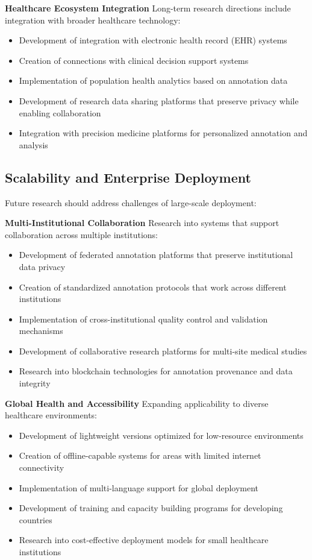 \textbf{Healthcare Ecosystem Integration}
Long-term research directions include integration with broader healthcare technology:

\begin{itemize}
    \item Development of integration with electronic health record (EHR) systems
    \item Creation of connections with clinical decision support systems
    \item Implementation of population health analytics based on annotation data
    \item Development of research data sharing platforms that preserve privacy while enabling collaboration
    \item Integration with precision medicine platforms for personalized annotation and analysis
\end{itemize}

\subsection{Scalability and Enterprise Deployment}

Future research should address challenges of large-scale deployment:

\textbf{Multi-Institutional Collaboration}
Research into systems that support collaboration across multiple institutions:

\begin{itemize}
    \item Development of federated annotation platforms that preserve institutional data privacy
    \item Creation of standardized annotation protocols that work across different institutions
    \item Implementation of cross-institutional quality control and validation mechanisms
    \item Development of collaborative research platforms for multi-site medical studies
    \item Research into blockchain technologies for annotation provenance and data integrity
\end{itemize}

\textbf{Global Health and Accessibility}
Expanding applicability to diverse healthcare environments:

\begin{itemize}
    \item Development of lightweight versions optimized for low-resource environments
    \item Creation of offline-capable systems for areas with limited internet connectivity
    \item Implementation of multi-language support for global deployment
    \item Development of training and capacity building programs for developing countries
    \item Research into cost-effective deployment models for small healthcare institutions
\end{itemize}

